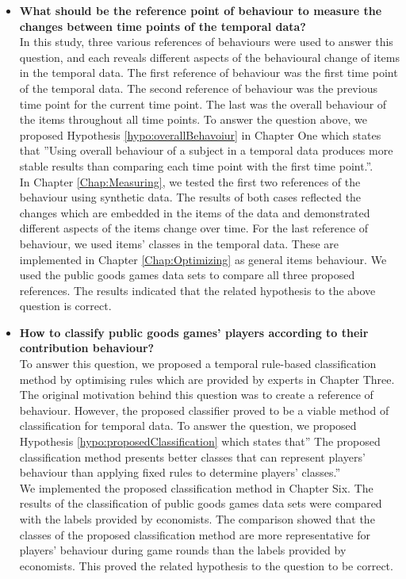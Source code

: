 \begin{itemize}
    \item \textbf{What should be the reference point of behaviour to measure the changes between time points of the temporal data?}\\
    In this study, three various references of behaviours were used to answer this question, and each reveals different aspects of the behavioural change of items in the temporal data. The first reference of behaviour was the first time point of the temporal data. The second reference of behaviour was the previous time point for the current time point. The last was the overall behaviour of the items throughout all time points. To answer the question above, we proposed Hypothesis \ref{hypo:overallBehavoiur} in Chapter One which states that ''Using overall behaviour of a subject in a temporal data produces more stable results than comparing each time point with the first time point.''.\\
    In Chapter \ref{Chap:Measuring}, we tested the first two references of the behaviour using synthetic data. The results of both cases reflected the changes which are embedded in the items of the data and demonstrated different aspects of the items change over time. For the last reference of behaviour, we used items' classes in the temporal data. These are implemented in Chapter \ref{Chap:Optimizing} as general items behaviour. We used the public goods games data sets to compare all three proposed references. The results indicated that the related hypothesis to the above question is correct. 


    \item \textbf{How to classify public goods games' players according to their contribution behaviour?}\\
    To answer this question, we proposed a temporal rule-based classification method by optimising rules which are provided by experts in Chapter Three. The original motivation behind this question was to create a reference of behaviour. However, the proposed classifier proved to be a viable method of classification for temporal data. To answer the question, we proposed Hypothesis \ref{hypo:proposedClassification} which states that'' The proposed classification method presents better classes that can represent players' behaviour than applying fixed rules to determine players' classes.''\\
    We implemented the proposed classification method in Chapter Six. The results of the classification of public goods games data sets were compared with the labels provided by economists. The comparison showed that the classes of the proposed classification method are more representative for players' behaviour during game rounds than the labels provided by economists. This proved the related hypothesis to the question to be correct. 
    

\end{itemize}
